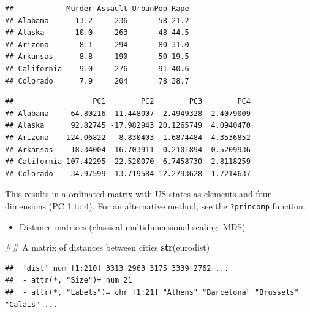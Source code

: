 \documentclass[]{book}
\newenvironment{Shaded}{\begin{snugshade}}{\end{snugshade}}
\newcommand{\KeywordTok}[1]{\textcolor[rgb]{0.13,0.29,0.53}{\textbf{#1}}}
\newcommand{\StringTok}[1]{\textcolor[rgb]{0.31,0.60,0.02}{#1}}
\newcommand{\OperatorTok}[1]{\textcolor[rgb]{0.81,0.36,0.00}{\textbf{#1}}}
\newcommand{\NormalTok}[1]{#1}
\providecommand{\tightlist}{%
  \setlength{\itemsep}{0pt}\setlength{\parskip}{0pt}}
\theoremstyle{definition}
\theoremstyle{definition}
\theoremstyle{definition}
\theoremstyle{remark}
\begin{document}
\begin{verbatim}
##            Murder Assault UrbanPop Rape
## Alabama      13.2     236       58 21.2
## Alaska       10.0     263       48 44.5
## Arizona       8.1     294       80 31.0
## Arkansas      8.8     190       50 19.5
## California    9.0     276       91 40.6
## Colorado      7.9     204       78 38.7
\end{verbatim}

\begin{Shaded}
\end{Shaded}

\begin{verbatim}
##                  PC1        PC2        PC3        PC4
## Alabama     64.80216 -11.448007 -2.4949328 -2.4079009
## Alaska      92.82745 -17.982943 20.1265749  4.0940470
## Arizona    124.06822   8.830403 -1.6874484  4.3536852
## Arkansas    18.34004 -16.703911  0.2101894  0.5209936
## California 107.42295  22.520070  6.7458730  2.8118259
## Colorado    34.97599  13.719584 12.2793628  1.7214637
\end{verbatim}

This results in a ordinated matrix with US states as elements and four
dimensions (PC 1 to 4). For an alternative method, see the
\texttt{?princomp} function.

\begin{itemize}
\tightlist
\item
  Distance matrices (classical multidimensional scaling; MDS)
\end{itemize}

\begin{Shaded}
\begin{Highlighting}[]
\NormalTok{## A matrix of distances between cities}
\KeywordTok{str}\NormalTok{(eurodist)}
\end{Highlighting}
\end{Shaded}

\begin{verbatim}
##  'dist' num [1:210] 3313 2963 3175 3339 2762 ...
##  - attr(*, "Size")= num 21
##  - attr(*, "Labels")= chr [1:21] "Athens" "Barcelona" "Brussels" "Calais" ...
\end{verbatim}
\end{document}
